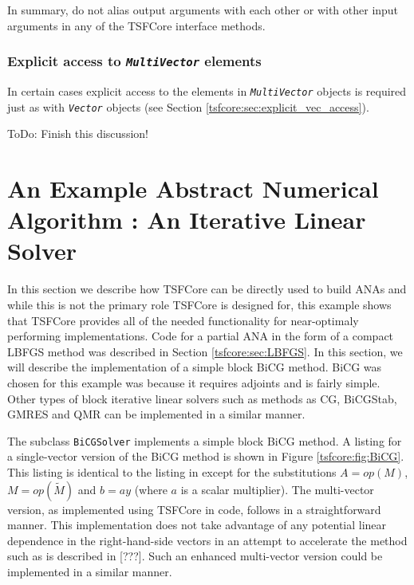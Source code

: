 In summary, do not alias output arguments with each other or with
other input arguments in any of the TSFCore interface methods.

%
\subsubsection{Explicit access to \texttt{\textit{MultiVector}} elements}
\label{tsfcore:sec:explicit_multi_vec_access}
%

In certain cases explicit access to the elements in
{}\texttt{\textit{Multi\-Vector}} objects is required just as with
{}\texttt{\textit{Vector}} objects (see Section
{}\ref{tsfcore:sec:explicit_vec_access}).

ToDo: Finish this discussion!

%
\section{An Example Abstract Numerical Algorithm : An Iterative Linear Solver}
\label{tsfcore:sec:ANA_iter_solver_example}
%

In this section we describe how TSFCore can be directly used to build
ANAs and while this is not the primary role TSFCore is designed for, this
example shows that TSFCore provides all of the needed functionality for
near-optimaly performing implementations.  Code for a partial ANA in
the form of a compact LBFGS method was described in Section
\ref{tsfcore:sec:LBFGS}.  In this section, we will describe the
implementation of a simple block BiCG
\cite{ref:tmpls_for_iter_systems} method.  BiCG was chosen for this
example was because it requires adjoints and is fairly simple.  Other
types of block iterative linear solvers such as methods as CG,
BiCGStab, GMRES and QMR \cite{ref:tmpls_for_iter_systems} can be
implemented in a similar manner.

The subclass \texttt{BiCG\-Solver} implements a simple block BiCG
method.  A listing for a single-vector version of the BiCG method is
shown in Figure \ref{tsfcore:fig:BiCG}.  This listing is identical to
the listing in \cite{ref:tmpls_for_iter_systems} except for the
substitutions $A = op(M)$, $M = op(\tilde{M})$ and $b =a y$ (where $a$
is a scalar multiplier).  The multi-vector version, as implemented
using TSFCore in code, follows in a straightforward manner.  This
implementation does not take advantage of any potential linear
dependence in the right-hand-side vectors in an attempt to accelerate
the method such as is described in [???].  Such an enhanced
multi-vector version could be implemented in a similar manner.

